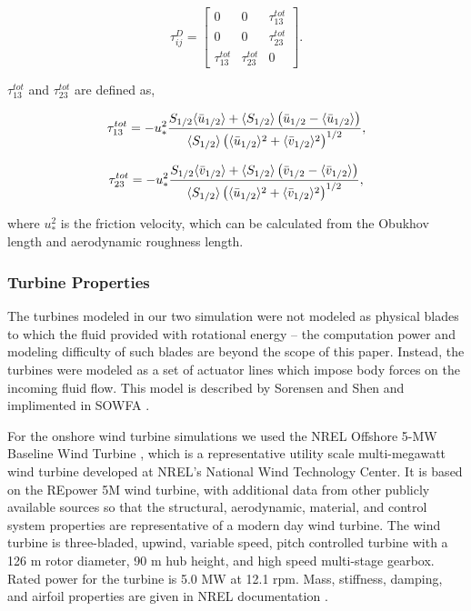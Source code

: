 \begin{equation}
   \label{wall model}
   \tau^D_{ij}=\begin{bmatrix} 0 & 0 & \tau^{tot}_{13} \\ 0 & 0 & \tau^{tot}_{23} \\ \tau^{tot}_{13} & \tau^{tot}_{23} &0 \end{bmatrix}.
\end{equation}

$\tau^{tot}_{13}$ and $ \tau^{tot}_{23}$ are defined as,

\begin{equation}
   \label{tau13}
   \tau^{tot}_{13}=
-u^2_*\frac{S_{1/2}\langle \bar{u}_{1/2}\rangle+\langle S_{1/2}\rangle\left( \bar{u}_{1/2}-\langle\bar{u}_{1/2}\rangle\right) }
{\langle S_{1/2}\rangle\left( \langle\bar{u}_{1/2}\rangle^2+\langle \bar{v}_{1/2}\rangle^2\right)^{1/2} },
\end{equation}

\begin{equation}
   \label{tau23}
   \tau^{tot}_{23}=
   -u^2_*\frac{S_{1/2}\langle \bar{v}_{1/2}\rangle+\langle S_{1/2}\rangle\left( \bar{v}_{1/2}-\langle\bar{v}_{1/2}\rangle\right) }
   {\langle S_{1/2}\rangle\left( \langle\bar{u}_{1/2}\rangle^2+\langle \bar{v}_{1/2}\rangle^2\right)^{1/2} },
\end{equation}

where $u^2_*$ is the friction velocity, which can be calculated from the Obukhov length and aerodynamic roughness length.

\subsubsection{Turbine Properties}

The turbines modeled in our two simulation were not modeled as physical blades to which the fluid provided with rotational energy -- the computation power and modeling difficulty of such blades are beyond the scope of this paper. Instead, the turbines were modeled as a set of actuator lines which impose body forces on the incoming fluid flow. This model is described by Sorensen and Shen \cite{sorensen:393} and implimented in SOWFA \cite{SOWFA}.

For the onshore wind turbine simulations we used the NREL Offshore 5-MW Baseline Wind Turbine \cite{jonkman_definition_2009}, which is a representative utility scale multi-megawatt wind turbine developed at NREL's National Wind Technology Center.  It is based on the REpower 5M wind turbine, with additional data from other publicly available sources so that the structural, aerodynamic, material, and control system properties are representative of a modern day wind turbine.  The wind turbine is three-bladed, upwind, variable speed, pitch controlled turbine with a 126 m rotor diameter, 90 m hub height, and high speed multi-stage gearbox.  Rated power for the turbine is 5.0 MW at 12.1 rpm.  Mass, stiffness, damping, and airfoil properties are given in NREL documentation \cite{jonkman_definition_2009}.

